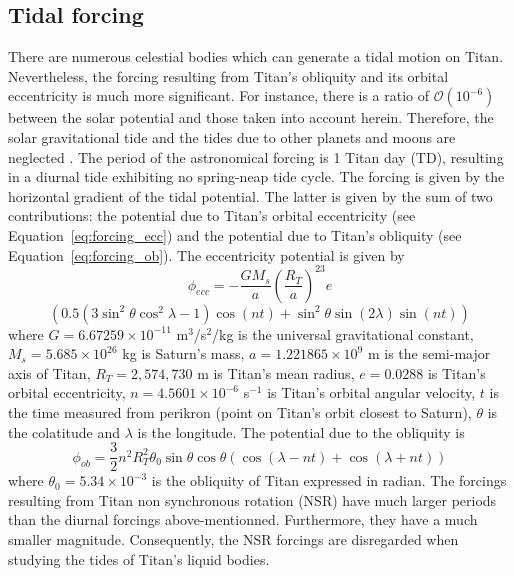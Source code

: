 \subsection{Tidal forcing}
\label{sec:intro:forcing}
There are numerous celestial bodies which can generate a tidal motion on Titan. Nevertheless, the forcing resulting from Titan's obliquity and its orbital eccentricity is much more significant. For instance, there is a ratio of $\mathcal{O}(10^{-6})$ between the solar potential and those taken into account herein. Therefore, the solar gravitational tide and the tides due to other planets and moons are neglected \citep{sagan1982tide}. The period of the astronomical forcing is 1 Titan day (TD), resulting in a diurnal tide exhibiting no spring-neap tide cycle. The forcing is given by the horizontal gradient of the tidal potential. The latter is given by the sum of two contributions: the potential due to Titan's orbital eccentricity (see Equation~\ref{eq:forcing_ecc}) and the potential due to Titan's obliquity (see Equation~\ref{eq:forcing_ob}). The eccentricity potential is given by \citep{dermott1995tidal}
\begin{equation*}
\phi_{ecc} = -\frac{GM_s}{a} \left(\frac{R_T}{a}\right)^23e
\end{equation*}
\begin{equation}
\left(0.5(3\sin^2\theta\cos^2\lambda-1)\cos(nt)+\sin^2\theta\sin(2\lambda)\sin(nt)\right)
\label{eq:forcing_ecc}
\end{equation}
where $G=6.67259\times10^{-11}$ m$^3$/s$^{2}$/kg is the universal gravitational constant, $M_s=5.685\times10^{26}$ kg is Saturn's mass, $a=1.221865\times10^9$ m is the semi-major axis of Titan, $R_T=2,574,730$ m is Titan's mean radius, $e=0.0288$ is Titan's orbital eccentricity, $n=4.5601\times10^{-6}$ s$^{-1}$ is Titan's orbital angular velocity, $t$ is the time measured from perikron (point on Titan's orbit closest to Saturn), $\theta$ is the colatitude and $\lambda$ is the longitude. The potential due to the obliquity is \citep{tyler2008strong}
\begin{equation}
\phi_{ob} = \frac{3}{2}n^2R_T^2\theta_0\sin\theta\cos\theta\left(\cos(\lambda-nt)+\cos(\lambda+nt)\right)
\label{eq:forcing_ob}
\end{equation}
where $\theta_0=5.34\times10^{-3}$ is the obliquity of Titan expressed in radian. The forcings resulting from Titan non synchronous rotation (NSR) have much larger periods than the diurnal forcings above-mentionned. Furthermore, they have a much smaller magnitude. Consequently, the NSR forcings are disregarded when studying the tides of Titan's liquid bodies.\\

